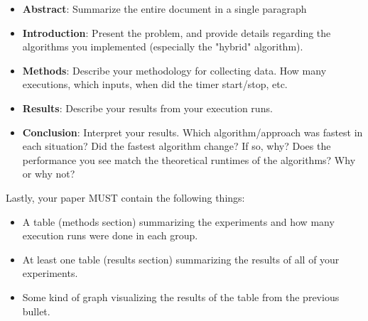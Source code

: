 \documentclass[paper=a4, fontsize=11pt, parskip=full]{scrartcl} %
\numberwithin{equation}{section} %
\numberwithin{figure}{section} %
\numberwithin{table}{section} %
\begin{document}
\begin{itemize}
	\item \textbf{Abstract}: Summarize the entire document in a single paragraph
	\item \textbf{Introduction}: Present the problem, and provide details regarding the algorithms you implemented (especially the "hybrid" algorithm).
	\item \textbf{Methods}: Describe your methodology for collecting data. How many executions, which inputs, when did the timer start/stop, etc.
	\item \textbf{Results}: Describe your results from your execution runs.
	\item \textbf{Conclusion}: Interpret your results. Which algorithm/approach was fastest in each situation? Did the fastest algorithm change? If so, why? Does the performance you see match the theoretical runtimes of the algorithms? Why or why not?
\end{itemize}

Lastly, your paper MUST contain the following things:

\begin{itemize}
	\item A table (methods section) summarizing the experiments and how many execution runs were done in each group.
	\item At least one table (results section) summarizing the results of all of your experiments.
	\item Some kind of graph visualizing the results of the table from the previous bullet.
\end{itemize}


\end{document}
